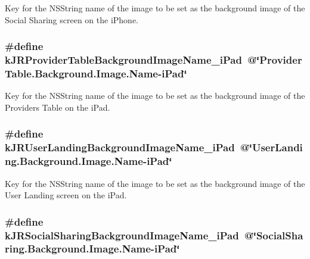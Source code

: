 Key for the {\ttfamily NSString} name of the image to be set as the background image of the Social Sharing screen on the iPhone. \hypertarget{group__custom_interface_ga25b26cff96d8f174f3bdc040031466b7}{
\subsubsection[{kJRProviderTableBackgroundImageName\_\-iPad}]{\setlength{\rightskip}{0pt plus 5cm}\#define kJRProviderTableBackgroundImageName\_\-iPad~@\char`\"{}ProviderTable.Background.Image.Name-\/iPad\char`\"{}}}
\label{group__custom_interface_ga25b26cff96d8f174f3bdc040031466b7}
Key for the {\ttfamily NSString} name of the image to be set as the background image of the Providers Table on the iPad. \hypertarget{group__custom_interface_ga52b4fb3801cf3fe6e5a294d9a4d1ff0a}{
\subsubsection[{kJRUserLandingBackgroundImageName\_\-iPad}]{\setlength{\rightskip}{0pt plus 5cm}\#define kJRUserLandingBackgroundImageName\_\-iPad~@\char`\"{}UserLanding.Background.Image.Name-\/iPad\char`\"{}}}
\label{group__custom_interface_ga52b4fb3801cf3fe6e5a294d9a4d1ff0a}
Key for the {\ttfamily NSString} name of the image to be set as the background image of the User Landing screen on the iPad. \hypertarget{group__custom_interface_ga646cb35f3a7ec2835872ee6df2aceb76}{
\subsubsection[{kJRSocialSharingBackgroundImageName\_\-iPad}]{\setlength{\rightskip}{0pt plus 5cm}\#define kJRSocialSharingBackgroundImageName\_\-iPad~@\char`\"{}SocialSharing.Background.Image.Name-\/iPad\char`\"{}}}
